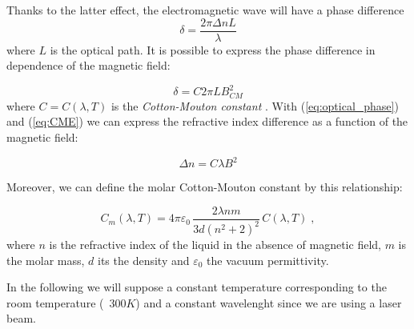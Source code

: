\documentclass[11pt,a4paper]{article}
\begin{document}
Thanks to the latter effect, the electromagnetic wave will have a phase difference
\begin{equation}\label{eq:optical_phase}
\delta=\frac{2\pi \Delta n L}{\lambda}
\end{equation}
where $L$ is the optical path. It is possible to express the phase difference in dependence of the magnetic field:

\begin{equation}\label{eq:CME}
\delta=C2\pi L B_{CM}^2
\end{equation}
where $C=C(\lambda,T)$ is the \emph{Cotton-Mouton constant} \cite{wilson1997simple}. With (\ref{eq:optical_phase}) and (\ref{eq:CME}) we can express the refractive index difference as a function of the magnetic field:

\begin{equation}\label{eq:Delta_n}
\Delta n=C\lambda B^2
\end{equation}

Moreover, we can define the molar Cotton-Mouton constant by this relationship:

\begin{equation}\label{eq:molar_CM}
C_m(\lambda, T)=4\pi\varepsilon_0\,\frac{2\lambda nm}{3d(n^2+2)^2}\,C(\lambda,T)\;,
\end{equation}
where $n$ is the refractive index of the liquid in the absence of magnetic field, $m$ is the molar mass, $d$ its the density and $\varepsilon_0$ the vacuum permittivity.

In the following we will suppose a constant temperature corresponding to the room temperature (~$300K$) and a constant wavelenght since we are using a laser beam.
\end{document}
